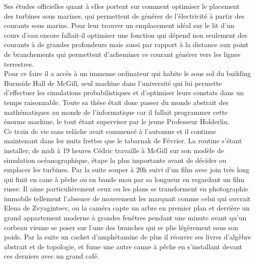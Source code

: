 \documentclass{article}
\begin{document}
Ses études officielles quant à elles portent sur comment optimiser le
placement des turbines sous marines, qui permettent de générer de l'électricité
à partir des courants sous marins. Pour leur trouver un emplacement idéal sur le
lit d'un cours d'eau encore fallait-il optimiser une fonction qui dépend non
seulement des courants à de grandes profondeurs mais aussi par rapport à la
distance aux point de branchements qui permettent d'acheminer ce courant
générer vers les lignes terrestres. \\

Pour ce faire il a accès à un immense ordinateur qui habite le sous sol du
building Burnside Hall de McGill, seul machine dans l'université qui lui
permette d'effectuer les simulations probabilistiques et d'optimiser leurs
constats dans un temps raisonnable. Toute sa thèse était donc passer du monde
abstrait des mathématiques au monde de l'informatique car il fallait programmer
cette énorme machine, le tout étant superviser par le jeune Professeur
Holderlin.\\

Ce train de vie sans relâche avait commencé à l'automne et il continue
maintenant dans les nuits frettes que le tabarnak de Février. La routine s'étant
installer; de midi à 19 heures Cédric travaille à McGill sur son modèle de
simulation océanographique, étape la plus importante avant de décider ou
emplacer les turbines. Par la suite souper à 20h suivi d'un film avec join très
long qui finit en cane à pèche ou en bande mou par sa longueur en regardant
un film russe. Il aime particulièrement ceux ou les plans se transforment en
photographie immobile tellement l'absence de mouvement les marquait comme celui
qui ouvrait Elena de Zvyagintsev, ou la caméra capte un arbre en premier plan et
derrière un grand appartement moderne à grandes fenêtres pendant une minute
avant qu'un corbeau vienne se poser sur l'une des branches qui se plie
légèrement sous son poids. Par la suite un cachet d'amphétamine de plus il
réouvre ses livres d'algèbre abstrait et de topologie, et fume une autre
canne à pêche en s'installant devant ces derniers avec un grand café.\\
\end{document}
